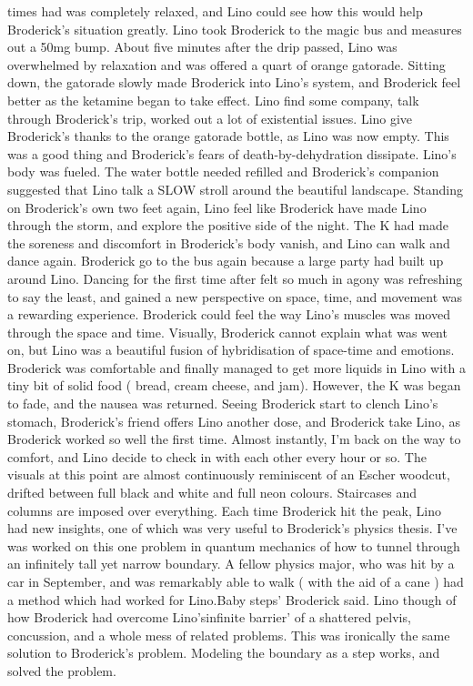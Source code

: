 \documentclass[12pt]{book}
\begin{document}
times had was completely relaxed, and Lino could see how this would help Broderick's situation greatly. Lino took Broderick to the magic bus and measures out a 50mg bump. About five minutes after the drip passed, Lino was overwhelmed by relaxation and was offered a quart of orange gatorade. Sitting down, the gatorade slowly made Broderick into Lino's system, and Broderick feel better as the ketamine began to take effect. Lino find some company, talk through Broderick's trip, worked out a lot of existential issues. Lino give Broderick's thanks to the orange gatorade bottle, as Lino was now empty. This was a good thing and Broderick's fears of death-by-dehydration dissipate. Lino's body was fueled. The water bottle needed refilled and Broderick's companion suggested that Lino talk a SLOW stroll around the beautiful landscape. Standing on Broderick's own two feet again, Lino feel like Broderick have made Lino through the storm, and explore the positive side of the night. The K had made the soreness and discomfort in Broderick's body vanish, and Lino can walk and dance again. Broderick go to the bus again because a large party had built up around Lino. Dancing for the first time after felt so much in agony was refreshing to say the least, and gained a new perspective on space, time, and movement was a rewarding experience. Broderick could feel the way Lino's muscles was moved through the space and time. Visually, Broderick cannot explain what was went on, but Lino was a beautiful fusion of hybridisation of space-time and emotions. Broderick was comfortable and finally managed to get more liquids in Lino with a tiny bit of solid food ( bread, cream cheese, and jam). However, the K was began to fade, and the nausea was returned. Seeing Broderick start to clench Lino's stomach, Broderick's friend offers Lino another dose, and Broderick take Lino, as Broderick worked so well the first time. Almost instantly, I'm back on the way to comfort, and Lino decide to check in with each other every hour or so. The visuals at this point are almost continuously reminiscent of an Escher woodcut, drifted between full black and white and full neon colours. Staircases and columns are imposed over everything. Each time Broderick hit the peak, Lino had new insights, one of which was very useful to Broderick's physics thesis. I've was worked on this one problem in quantum mechanics of how to tunnel through an infinitely tall yet narrow boundary. A fellow physics major, who was hit by a car in September, and was remarkably able to walk ( with the aid of a cane ) had a method which had worked for Lino.Baby steps' Broderick said. Lino though of how Broderick had overcome Lino'sinfinite barrier' of a shattered pelvis, concussion, and a whole mess of related problems. This was ironically the same solution to Broderick's problem. Modeling the boundary as a step works, and solved the problem.
\end{document}
